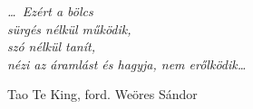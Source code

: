 \cleartorecto
\thispagestyle{empty}

\mbox{}\vfill

\noindent
{\itshape
  \ldots\ Ezért a bölcs\\
  sürgés nélkül működik,\\
  szó nélkül tanít,\\
  nézi az áramlást és hagyja, nem erőlködik\ldots
}

\bigskip

\noindent
{\smaller Tao Te King, ford. Weöres Sándor}

\vfill\mbox{}
